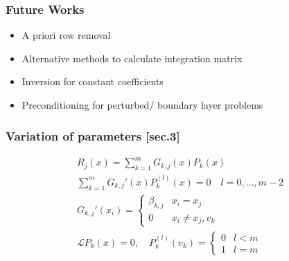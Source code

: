 \documentclass{beamer}
\begin{document}
\begin{frame}
\frametitle{Future Works}
\begin{itemize}
\item A priori row removal
\item Alternative methods to calculate integration matrix
\item Inversion for constant coefficients
\item Preconditioning for perturbed/ boundary layer problems
\end{itemize}
\end{frame}

\begin{frame}
\frametitle{Variation of parameters [sec.3]}
\begin{equation*}
\begin{gathered}
R_j(x) = \sum_{k=1}^m G_{k,j}(x) P_k(x) \\
\sum_{k=1}^m G_{k,j}'(x) P_k^{(l)}(x) = 0 \quad l = 0,...,m-2 \\
G_{k,j}'(x_i) = \begin{cases} \beta_{k,j} & x_i = x_j \\ 0 & x_i \neq x_j, v_k \end{cases} \\
\mathcal{L} P_k(x) = 0, \quad P_k^{(l)}(v_k) = \begin{cases} 0 & l < m \\ 1 & l =m \end{cases}
\end{gathered}
\end{equation*}
\end{frame}
\end{document}
